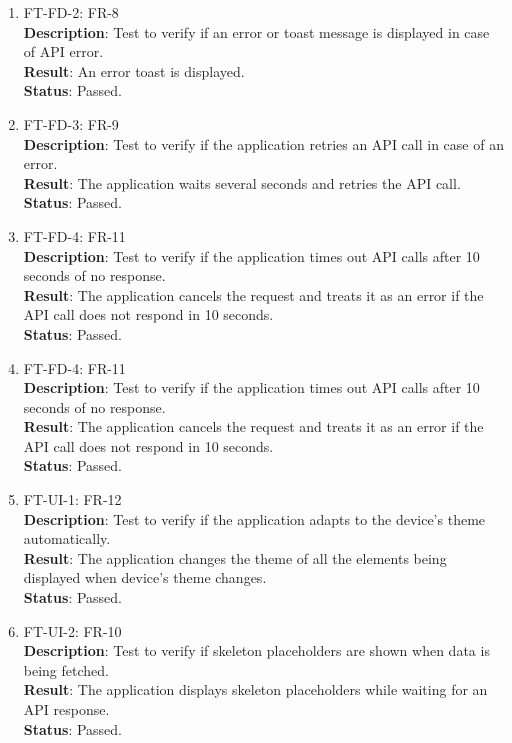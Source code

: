 \documentclass[12pt, titlepage]{article}
\begin{document}
\begin{enumerate}
    \item FT-FD-2: FR-8\\
    \textbf{Description}: Test to verify if an error or toast message is displayed in case of API error.\\
    \textbf{Result}: An error toast is displayed.\\
    \textbf{Status}: Passed.\\
    
    \item FT-FD-3: FR-9\\
    \textbf{Description}: Test to verify if the application retries an API call in case of an error.\\
    \textbf{Result}: The application waits several seconds and retries the API call.\\
    \textbf{Status}: Passed.\\
    
    \item FT-FD-4: FR-11\\
    \textbf{Description}: Test to verify if the application times out API calls after 10 seconds of no response.\\
    \textbf{Result}: The application cancels the request and treats it as an error if the API call does not respond in 10 seconds.\\
    \textbf{Status}: Passed.\\
    
    \item FT-FD-4: FR-11\\
    \textbf{Description}: Test to verify if the application times out API calls after 10 seconds of no response.\\
    \textbf{Result}: The application cancels the request and treats it as an error if the API call does not respond in 10 seconds.\\
    \textbf{Status}: Passed.\\
    
    \item FT-UI-1: FR-12\\
    \textbf{Description}: Test to verify if the application adapts to the device's theme automatically.\\
    \textbf{Result}: The application changes the theme of all the elements being displayed when device's theme changes.\\
    \textbf{Status}: Passed.\\
    
    \item FT-UI-2: FR-10\\
    \textbf{Description}: Test to verify if skeleton placeholders are shown when data is being fetched.\\
    \textbf{Result}: The application displays skeleton placeholders while waiting for an API response.\\
    \textbf{Status}: Passed.\\
    

\end{enumerate}
\end{document}
